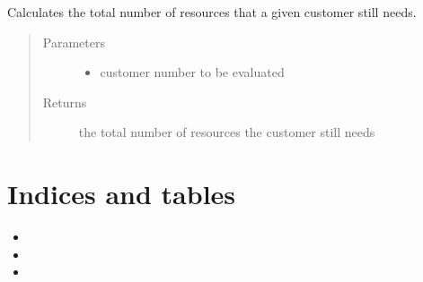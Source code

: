 \documentclass[letterpaper,10pt,english,openany,oneside]{sphinxmanual}
\begin{document}

\begin{fulllineitems}
\label{\detokenize{source_code:c.calculate_need}}%
\pysigstartmultiline
{}%
\pysigstopmultiline
Calculates the total number of resources that a given customer still needs.
\begin{quote}\begin{description}
\item[{Parameters}] \leavevmode\begin{itemize}
\item {} 
 \textendash{} customer number to be evaluated

\end{itemize}

\item[{Returns}] \leavevmode
the total number of resources the customer still needs

\end{description}\end{quote}

\end{fulllineitems}



\chapter{Indices and tables}
\label{\detokenize{index:indices-and-tables}}\begin{itemize}
\item {} 

\item {} 

\item {} 

\end{itemize}



\renewcommand{\indexname}{Index}
\printindex
\end{document}
